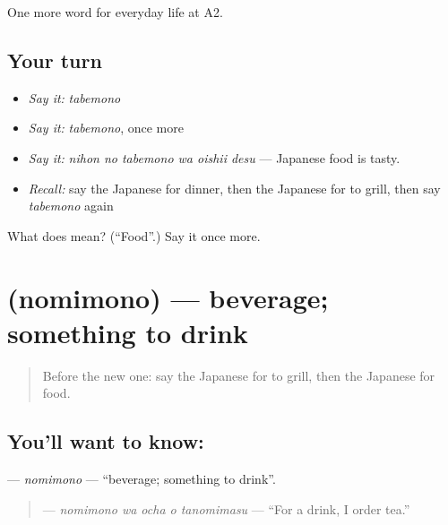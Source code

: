 \begin{grammarlens}[title={What you've built}]
One more word for everyday life at A2.
\end{grammarlens}

\subsection*{Your turn}
\begin{itemize}
\raggedright
  \item \emph{Say it:} \emph{tabemono}
  \item \emph{Say it:} \emph{tabemono}, once more
  \item \emph{Say it:} \emph{nihon no tabemono wa oishii desu} — Japanese food is tasty.
  \item \emph{Recall:} say the Japanese for dinner, then the Japanese for to grill, then say \emph{tabemono} again
\end{itemize}

\begin{tcolorbox}[breakable,colback=teal!4,colframe=teal!35!black,title={Before you move on}]
What does  mean? (\textquotedblleft{}Food\textquotedblright{}.) Say it once more.
\end{tcolorbox}
\section[\texorpdfstring{\ja{のみもの} (nomimono)}{のみもの (nomimono)}]{ (nomimono) — beverage; something to drink}

\label{lesson:JA-C173-nomimono}



\begin{quote}
Before the new one: say the Japanese for to grill, then the Japanese for food.
\end{quote}

\subsection*{You'll want to know: }
\textbf{} — \emph{nomimono} — \textquotedblleft{}beverage; something to drink\textquotedblright{}.

\begin{quote}
\textbf{  } — \emph{nomimono wa ocha o tanomimasu} — \textquotedblleft{}For a drink, I order tea.\textquotedblright{}
\end{quote}

